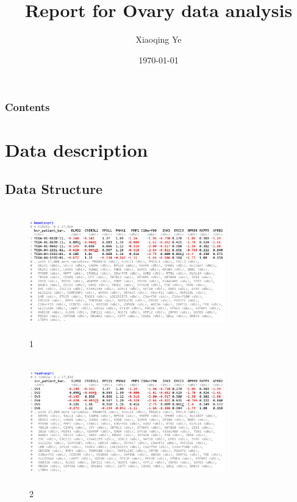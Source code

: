 \documentclass[cjk,10pt]{beamer}
\begin{document}
\begin{CJK*}{GBK}{song}     %
\title{Report for Ovary data analysis}
\author{Xiaoqing Ye}
\date{\today}
    \begin{frame} %
        \titlepage
    \end{frame}
    \begin{frame}
        \frametitle{Contents}
        \tableofcontents
    \end{frame}

    \section{Data description}
    \subsection{Data Structure}
    \begin{frame}
\begin{figure}[htbp]
\centering
\includegraphics[height=5.5cm, width=8.5cm]{Yxq1as}
\caption{1}
\end{figure}


    \end{frame}
    \begin{frame}
\begin{figure}[htbp]
\centering
\includegraphics[height=5.5cm, width=8.5cm]{Yxq2as}
\caption{2}
\end{figure}



\end{frame}
\end{CJK*}
\end{document}
